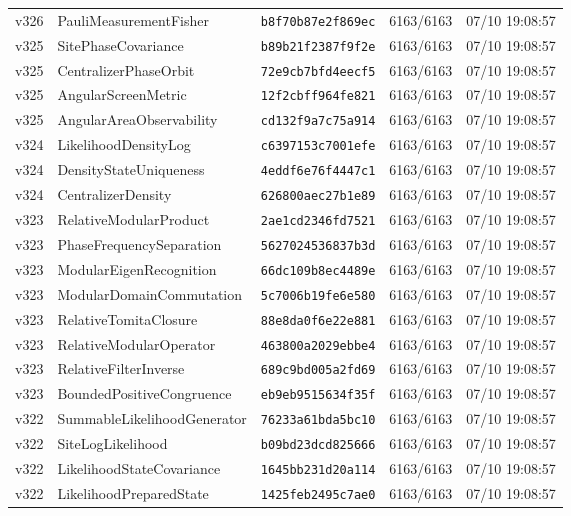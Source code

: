 \documentclass[11pt]{article}
\theoremstyle{definition}\newtheorem{deriv}{Derivação}
\begin{document}
{\begin{longtable}{@{}lllll@{}}
v326 & PauliMeasurementFisher & \texttt{b8f70b87e2f869ec} & 6163/6163 & 07/10 19:08:57 \\
v325 & SitePhaseCovariance & \texttt{b89b21f2387f9f2e} & 6163/6163 & 07/10 19:08:57 \\
v325 & CentralizerPhaseOrbit & \texttt{72e9cb7bfd4eecf5} & 6163/6163 & 07/10 19:08:57 \\
v325 & AngularScreenMetric & \texttt{12f2cbff964fe821} & 6163/6163 & 07/10 19:08:57 \\
v325 & AngularAreaObservability & \texttt{cd132f9a7c75a914} & 6163/6163 & 07/10 19:08:57 \\
v324 & LikelihoodDensityLog & \texttt{c6397153c7001efe} & 6163/6163 & 07/10 19:08:57 \\
v324 & DensityStateUniqueness & \texttt{4eddf6e76f4447c1} & 6163/6163 & 07/10 19:08:57 \\
v324 & CentralizerDensity & \texttt{626800aec27b1e89} & 6163/6163 & 07/10 19:08:57 \\
v323 & RelativeModularProduct & \texttt{2ae1cd2346fd7521} & 6163/6163 & 07/10 19:08:57 \\
v323 & PhaseFrequencySeparation & \texttt{5627024536837b3d} & 6163/6163 & 07/10 19:08:57 \\
v323 & ModularEigenRecognition & \texttt{66dc109b8ec4489e} & 6163/6163 & 07/10 19:08:57 \\
v323 & ModularDomainCommutation & \texttt{5c7006b19fe6e580} & 6163/6163 & 07/10 19:08:57 \\
v323 & RelativeTomitaClosure & \texttt{88e8da0f6e22e881} & 6163/6163 & 07/10 19:08:57 \\
v323 & RelativeModularOperator & \texttt{463800a2029ebbe4} & 6163/6163 & 07/10 19:08:57 \\
v323 & RelativeFilterInverse & \texttt{689c9bd005a2fd69} & 6163/6163 & 07/10 19:08:57 \\
v323 & BoundedPositiveCongruence & \texttt{eb9eb9515634f35f} & 6163/6163 & 07/10 19:08:57 \\
v322 & SummableLikelihoodGenerator & \texttt{76233a61bda5bc10} & 6163/6163 & 07/10 19:08:57 \\
v322 & SiteLogLikelihood & \texttt{b09bd23dcd825666} & 6163/6163 & 07/10 19:08:57 \\
v322 & LikelihoodStateCovariance & \texttt{1645bb231d20a114} & 6163/6163 & 07/10 19:08:57 \\
v322 & LikelihoodPreparedState & \texttt{1425feb2495c7ae0} & 6163/6163 & 07/10 19:08:57 \\

\end{longtable}}
\end{document}
